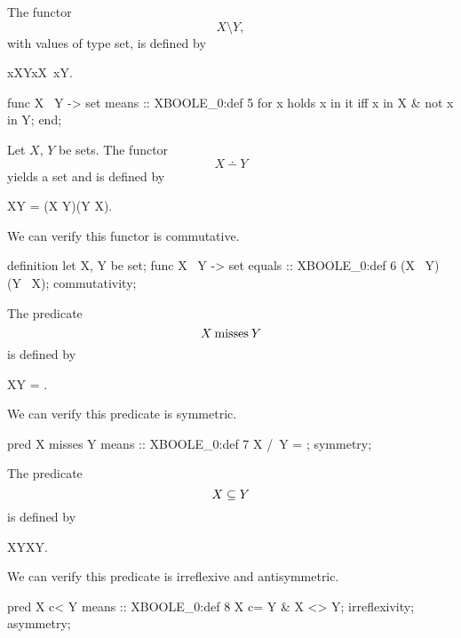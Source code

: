 \begin{paracol}{2}
\switchcolumn*\ensurevspace{5cm}\noindent%
The functor
\[ X\setminus Y,\]
with values of type set, is defined by
\begin{definition}
x\in X\setminus Y\iff x\in X\land\ \neg x\in Y. 
\end{definition}

\switchcolumn

\begin{mizar}
  func X \ Y -> set
  means :: XBOOLE_0:def 5
  for x holds x in it
  iff x in X & not x in Y;
end;
\end{mizar}

\switchcolumn*\ensurevspace{5cm}
Let $X$, $Y$ be sets. The functor
\[ X\dotminus Y\]
yields a set and is defined by
\begin{definition}
X\dotminus Y = (X \setminus Y)\cup(Y \setminus X).
\end{definition}
We can verify this functor is commutative.

\switchcolumn
\begin{mizar}
definition
  let X, Y be set;
  func X \+\ Y -> set
  equals :: XBOOLE_0:def 6
  (X \ Y) \/ (Y \ X);
  commutativity;
\end{mizar}

\switchcolumn*\ensurevspace{5cm}
\noindent The predicate
\[ X\mathbin{\text{misses}} Y\]
is defined by
\begin{definition}
X\cap Y = \emptyset. %
\end{definition}
We can verify this predicate is symmetric.
\switchcolumn
\begin{mizar}
  pred X misses Y
  means :: XBOOLE_0:def 7
  X /\ Y = {};
  symmetry;
\end{mizar}

\switchcolumn*\ensurevspace{5cm}
\noindent The predicate
\[ X \propersubset Y \]
is defined by
\begin{definition}
X\subset Y\land X\neq Y.
\end{definition}
We can verify this predicate is irreflexive and antisymmetric.
\switchcolumn
\begin{mizar}
  pred X c< Y
  means :: XBOOLE_0:def 8
  X c= Y & X <> Y;
  irreflexivity;
  asymmetry;
\end{mizar}


\end{paracol}
